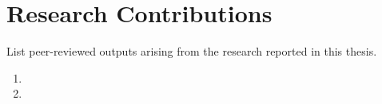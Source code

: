 \section*{Research Contributions}

List peer-reviewed outputs arising from the research reported in this thesis.

\begin{enumerate}
    \item [Add publication 1]
    \item [Add publication 2]
\end{enumerate}

